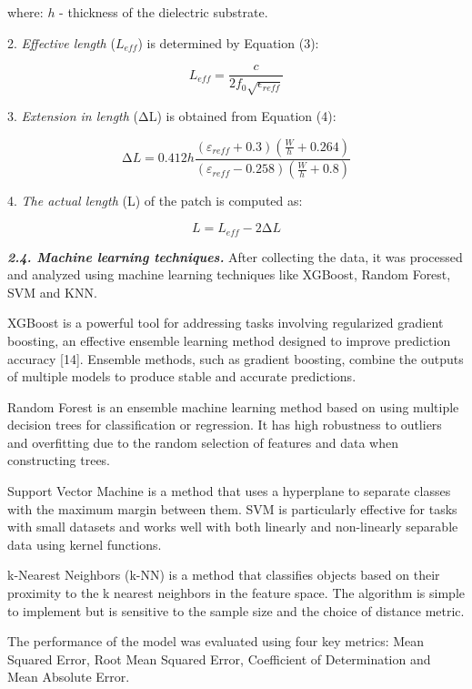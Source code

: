 \begin{multicols}{2}
where: \(h\) - thickness of the dielectric substrate.

2. \emph{Effective length} (\(L_{eff}\)) is determined by Equation (3):

\begin{equation}
L_{eff} = \frac{c}{2f_{0}\sqrt{\epsilon_{reff}}}
\end{equation}

3. \emph{Extension in length} (ΔL) is obtained from Equation (4):

\begin{equation}
\mathrm{\Delta}L = 0.412h\frac{(\varepsilon_{reff} + 0.3)(\frac{W}{h} + 0.264)}{(\varepsilon_{reff} - 0.258)(\frac{W}{h} + 0.8)}
\end{equation}

4. \emph{The actual length} (L) of the patch is computed as:

\begin{equation}
L = L_{eff} - 2\mathrm{\Delta}L
\end{equation}

\emph{{\bfseries 2.4. Machine learning techniques.}} After collecting the
data, it was processed and analyzed using machine learning techniques
like XGBoost, Random Forest, SVM and KNN.

XGBoost is a powerful tool for addressing tasks involving regularized
gradient boosting, an effective ensemble learning method designed to
improve prediction accuracy {[}14{]}. Ensemble methods, such as gradient
boosting, combine the outputs of multiple models to produce stable and
accurate predictions.

Random Forest is an ensemble machine learning method based on using
multiple decision trees for classification or regression. It has high
robustness to outliers and overfitting due to the random selection of
features and data when constructing trees.

Support Vector Machine is a method that uses a hyperplane to separate
classes with the maximum margin between them. SVM is particularly
effective for tasks with small datasets and works well with both
linearly and non-linearly separable data using kernel functions.

k-Nearest Neighbors (k-NN) is a method that classifies objects based on
their proximity to the k nearest neighbors in the feature space. The
algorithm is simple to implement but is sensitive to the sample size and
the choice of distance metric.

The performance of the model was evaluated using four key metrics: Mean
Squared Error, Root Mean Squared Error, Coefficient of Determination and
Mean Absolute Error.


\end{multicols}
